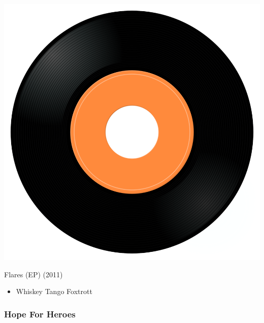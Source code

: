 \begin{minipage}[t]{0.25\textwidth}
\captionsetup{type=figure}
\includegraphics[width=\textwidth]{Images/cover.png}
\caption*{Flares (EP) (2011)}
\end{minipage}
\begin{minipage}[t]{0.25\textwidth}\vspace{0pt}
\begin{itemize}[nosep,leftmargin=1em,labelwidth=*,align=left]
	\setlength{\itemsep}{0pt}
	\item Whiskey Tango Foxtrott
\end{itemize}
\end{minipage}

\subsubsection{Hope For Heroes}

